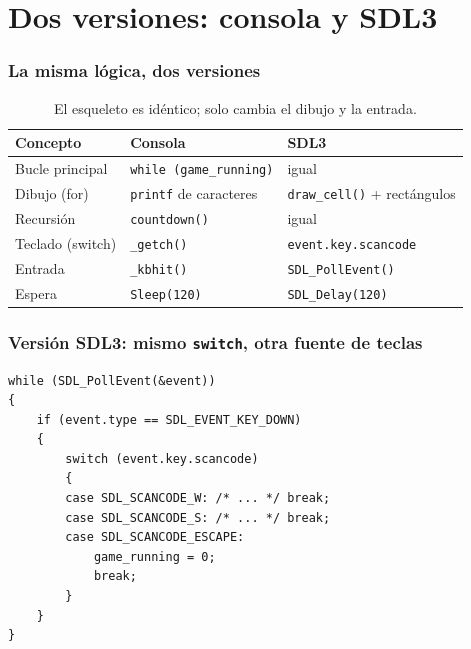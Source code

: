 \documentclass[]{beamer}
\begin{document}
\section{Dos versiones: consola y SDL3}
\begin{frame}
  \frametitle{La misma lógica, dos versiones}
  \small
  \begin{table}
  \centering
  \begin{tabular}{@{}p{3.1cm}p{3.0cm}p{3.4cm}@{}}
  \toprule
  \textbf{Concepto} & \textbf{Consola} & \textbf{SDL3} \\
  \midrule
  Bucle principal   & \texttt{while (game\_running)} & igual \\
  Dibujo (for)      & \texttt{printf} de caracteres  & \texttt{draw\_cell()} + rectángulos \\
  Recursión         & \texttt{countdown()}           & igual \\
  Teclado (switch)  & \texttt{\_getch()}             & \texttt{event.key.scancode} \\
  Entrada           & \texttt{\_kbhit()}            & \texttt{SDL\_PollEvent()} \\
  Espera            & \texttt{Sleep(120)}           & \texttt{SDL\_Delay(120)} \\
  \bottomrule
  \end{tabular}
  \caption{El esqueleto es idéntico; solo cambia el dibujo y la entrada.}
  \end{table}
\end{frame}

\begin{frame}[fragile]
  \frametitle{Versión SDL3: mismo \texttt{switch}, otra fuente de teclas}
  \lstset{style=myCStyle}
  \begin{lstlisting}
while (SDL_PollEvent(&event))
{
    if (event.type == SDL_EVENT_KEY_DOWN)
    {
        switch (event.key.scancode)
        {
        case SDL_SCANCODE_W: /* ... */ break;
        case SDL_SCANCODE_S: /* ... */ break;
        case SDL_SCANCODE_ESCAPE:
            game_running = 0;
            break;
        }
    }
}
  \end{lstlisting}
\end{frame}
\end{document}
